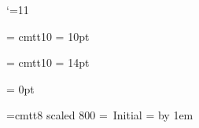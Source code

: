

\def\Yacas{{\sffamily yacas\/}}
\def\yacasheadersize{\tiny}


\catcode`\@=11\relax
\newdimen\yacasinputbaselineskip
\newdimen\yacasoutputbaselineskip
\newdimen\preyacasspace


\font\yacasinputfont = cmtt10
\yacasinputbaselineskip = 10pt

\font\yacasoutputfont = cmtt10
\yacasoutputbaselineskip = 14pt

\preyacasspace = 0pt



\font\yac@sheaderfont=cmtt8  scaled 800
=\hbox{\yac@sheaderfont\ Initial}
\newdimen\in@t
\in@t = 
\advance\in@t by 1em

\def\sm@llsk{\vskip 1ex}

\def\yac@stop{
\vskip -1ex
\hbox to \hsize{\vrule depth 1ex  height .3pt width .4pt
                \vrule height .4pt depth 0pt width 1.1em 
                \lower .4ex \hbox{\yacasheadersize\ \Yacas} 
                \hrulefill 
                \vrule depth 1ex height .3pt width .4pt}
\vskip 1ex}


\def\yac@sinittop{
\vskip -1ex
\hbox to \hsize{\vrule depth 1ex  height .3pt width .4pt
                \vrule height .4pt depth 0pt width 1.1em 
                \lower .4ex \hbox{\yacasheadersize\ \Yacas} 
                \hrulefill
                \lower .4ex \hbox{\yac@sheaderfont\ Initial}
                \vrule height .4pt depth 0pt width 1em 
                \vrule depth 1ex height .3pt width .4pt}
\vskip 1ex}

\def\yac@sparttop#1{
\vskip -1ex
\hbox to \hsize{\vrule depth 1ex  height .3pt width .4pt
                \vrule height .4pt depth 0pt width 1.1em 
                \lower .4ex \hbox{\yacasheadersize\ \Yacas} 
                \hrulefill
                \lower .4ex \hbox{\yac@sheaderfont\ #1}
                \hrulefill
                \vrule height .4pt depth 0pt width \in@t
                \vrule depth 1ex height .3pt width .4pt}
\vskip 1ex}

